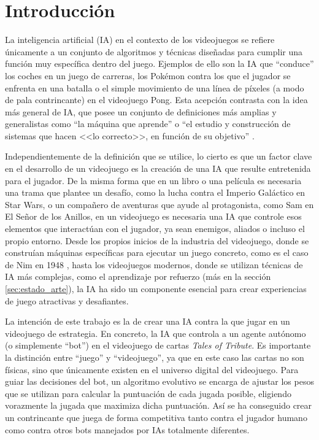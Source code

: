 \chapter{Introducción} \label{chap:introduccion}



La inteligencia artificial (IA) en el contexto de los videojuegos se refiere únicamente a un conjunto de algoritmos y técnicas diseñadas para cumplir una función muy específica dentro del juego. Ejemplos de ello son la IA que ``conduce'' los coches en un juego de carreras, los Pokémon contra los que el jugador se enfrenta en una batalla o el simple movimiento de una línea de píxeles (a modo de pala contrincante) en el videojuego Pong. Esta acepción contrasta con la idea más general de IA, que posee un conjunto de definiciones más amplias y generalistas como ``la máquina que aprende'' o ``el estudio y construcción de sistemas que hacen <<lo correcto>>, en función de su objetivo'' \cite{russell_artificial_2021}.

Independientemente de la definición que se utilice, lo cierto es que un factor clave en el desarrollo de un videojuego es la creación de una IA que resulte entretenida para el jugador. De la misma forma que en un libro o una película es necesaria una trama que plantee un desafío, como la lucha contra el Imperio Galáctico en Star Wars, o un compañero de aventuras que ayude al protagonista, como Sam en El Señor de los Anillos, en un videojuego es necesaria una IA que controle esos elementos que interactúan con el jugador, ya sean enemigos, aliados o incluso el propio entorno. Desde los propios inicios de la industria del videojuego, donde se construían máquinas específicas para ejecutar un juego concreto, como es el caso de Nim en 1948 \cite{redheffer_machine_1948}, hasta los videojuegos modernos, donde se utilizan técnicas de IA más complejas, como el aprendizaje por refuerzo (más en la sección \ref{sec:estado_arte}), la IA ha sido un componente esencial para crear experiencias de juego atractivas y desafiantes.

La intención de este trabajo es la de crear una IA contra la que jugar en un videojuego de estrategia. En concreto, la IA que controla a un agente autónomo (o simplemente ``bot'') en el videojuego de cartas \textit{Tales of Tribute}. Es importante la distinción entre ``juego'' y ``videojuego'', ya que en este caso las cartas no son físicas, sino que únicamente existen en el universo digital del videojuego. Para guiar las decisiones del bot, un algoritmo evolutivo se encarga de ajustar los pesos que se utilizan para calcular la puntuación de cada jugada posible, eligiendo vorazmente la jugada que maximiza dicha puntuación. Así se ha conseguido crear un contrincante que juega de forma competitiva tanto contra el jugador humano como contra otros bots manejados por IAs totalmente diferentes.